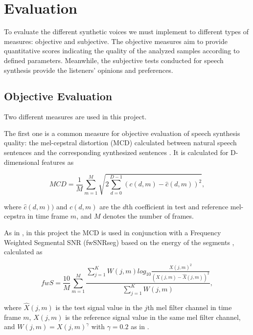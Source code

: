 \section{Evaluation}
\label{evaluation}
To evaluate the different synthetic voices we must implement to different types of measures: objective and subjective.
%
The objective measures aim to provide quantitative scores indicating the quality of the analyzed samples according to defined parameters.
%
Meanwhile, the subjective tests conducted for speech synthesis provide the listeners' opinions and preferences.

\subsection{Objective Evaluation}
\label{evaluation_objective}
Two different measures are used in this project.

The first one is a common measure for objective evaluation of speech synthesis quality: the mel-cepstral distortion (MCD) calculated between natural speech sentences and the corresponding synthesized sentences \cite{601}.
%
It is calculated for D-dimensional features as

\begin{centering}
\begin{equation}
MCD = \frac{1}{M}\sum_{m = 1}^{M}\sqrt{2\sum_{d=0}^{D-1}(c(d,m)-\hat{c}(d,m))^{2}},
\end{equation}
\end{centering}

where $\hat{c}(d,m))$ and $c(d,m)$ are the $d$th coefficient in test and reference mel-cepstra in time frame $m$, and $M$ denotes the number of frames.

As in \cite{karhila_jstsp_14}, in this project the MCD is used in conjunction with a Frequency Weighted Segmental SNR (fwSNRseg) based on the energy of the segments \cite{4389058}, calculated as

\begin{centering}
\begin{equation}
fwS = \frac{10}{M}\sum_{m=1}^{M}\frac{\sum_{j=1}^{K}W(j,m)log_{10}\frac{X(j,m)^{2}}{(X(j,m)-\hat{X}(j,m))^{2}}}{\sum_{j=1}^{K}W(j,m)},
\end{equation}
\end{centering}

where $\hat{X}(j,m)$ is the test signal value in the $j$th mel filter channel in time frame $m$, $X(j,m)$ is the reference signal value in the same mel filter channel, and $W(j,m) = X(j,m)^{\gamma}$ with $\gamma = 0.2$ as in \cite{4389058}.

